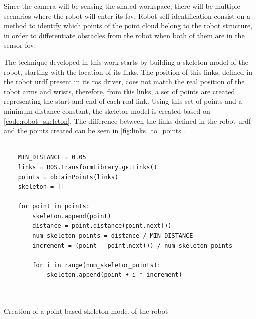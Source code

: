 \par Since the camera will be sensing the shared workspace, there will be multiple scenarios where the robot will enter its \ac{fov}. Robot self identification consist on a method to identify which points of the point cloud belong to the robot structure, in order to differentiate obstacles from the robot when both of them are in the sensor \ac{fov}.

\par The technique developed in this work starts by building a skeleton model of the robot, starting with the location of its links. The position of this links, defined in the robot \ac{urdf} present in its \ac{ros} driver, does not match the real position of the robot arms and wrists, therefore, from this links, a set of points are created representing the start and end of each real link. Using this set of points and a minimum distance constant, the skeleton model is created based on \autoref{code:robot_skeleton}. The difference between the links defined in the robot \ac{urdf} and the points created can be seen in \autoref{fig:links_to_points}.


\begin{listing}[h]
    \centering
    \begin{verbatim}

    MIN_DISTANCE = 0.05
    links = ROS.TransformLibrary.getLinks()
    points = obtainPoints(links)
    skeleton = []

    for point in points:  
        skeleton.append(point)
        distance = point.distance(point.next())
        num_skeleton_points = distance / MIN_DISTANCE
        increment = (point - point.next()) / num_skeleton_points

        for i in range(num_skeleton_points):
            skeleton.append(point + i * increment)

    
    \end{verbatim}
\caption{Creation of a point based skeleton model of the robot}
\label{code:robot_skeleton}
\end{listing}

